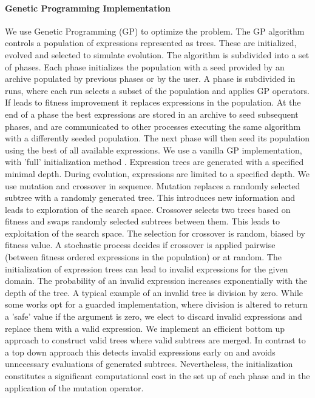 \paragraph{Genetic Programming Implementation}
We use Genetic Programming (GP) \cite{GP} to optimize the problem. The GP algorithm controls a population of expressions represented as trees. These are initialized, evolved and selected to simulate evolution.
The algorithm is subdivided into a set of phases. Each phase initializes the population with a seed provided by an archive populated by previous phases or by the user. A phase is subdivided in runs, where each run selects a subset of the population and applies GP operators. If leads to fitness improvement it replaces expressions in the population. At the end of a phase the best expressions are stored in an archive to seed subsequent phases, and are communicated to other processes executing the same algorithm with a differently seeded population. The next phase will then seed its population using the best of all available expressions.
We use a vanilla GP implementation, with 'full' initialization method \cite{GP}. Expression trees are generated with a specified minimal depth. During evolution, expressions are limited to a specified depth. 
We use mutation and crossover in sequence. Mutation replaces a randomly selected subtree with a randomly generated tree. This introduces new information and leads to exploration of the search space. Crossover selects two trees based on fitness and swaps randomly selected subtrees between them. This leads to exploitation of the search space. The selection for crossover is random, biased by fitness value. A stochastic process decides if crossover is applied pairwise (between fitness ordered expressions in the population) or at random.
The initialization of expression trees can lead to invalid expressions for the given domain. The probability of an invalid expression increases exponentially with the depth of the tree. A typical example of an invalid tree is division by zero. While some works opt for a guarded implementation, where division is altered to return a 'safe' value if the argument is zero, we elect to discard invalid expressions and replace them with a valid expression. We implement an efficient bottom up approach to construct valid trees where valid subtrees are merged. In contrast to a top down approach this detects invalid expressions early on and avoids unnecessary evaluations of generated subtrees. Nevertheless, the initialization constitutes a significant computational cost in the set up of each phase and in the application of the mutation operator.